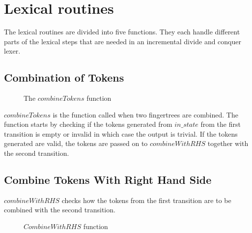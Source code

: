 \section{Lexical routines}
The lexical routines are divided into five functions. They each handle
different parts of the lexical steps that are needed in an incremental divide and
conquer lexer.

%  

\subsection{Combination of Tokens}
\begin{figure}[h!]
  
  \caption{The $combineTokens$ function \label{fig:combinetoks}}
\end{figure}

$combineTokens$ is the function called when two fingertrees are combined.
The function starts by checking if the tokens generated from $in\_state$ from
the first transition is empty or invalid in which case the output is trivial. If
the tokens generated are valid, the tokens are passed on to $combineWithRHS$
together with the second transition.

\subsection{Combine Tokens With Right Hand Side}
$combineWithRHS$ checks how the tokens from the first
transition are to be combined with the second transition.

\begin{figure}[h!]
  
  \caption{$CombineWithRHS$ function\label{fig:cwrhs}}
\end{figure}

